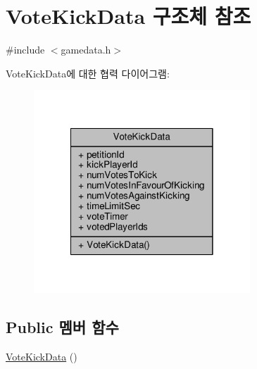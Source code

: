 \hypertarget{struct_vote_kick_data}{\section{Vote\-Kick\-Data 구조체 참조}
\label{struct_vote_kick_data}
}


{\ttfamily \#include $<$gamedata.\-h$>$}



Vote\-Kick\-Data에 대한 협력 다이어그램\-:\nopagebreak
\begin{figure}[H]
\begin{center}
\leavevmode
\includegraphics[width=230pt]{struct_vote_kick_data__coll__graph}
\end{center}
\end{figure}
\subsection*{Public 멤버 함수}
\begin{DoxyCompactItemize}
\item 
\hyperlink{struct_vote_kick_data_a4c0969c2c429557a27eaeff81f6ff58a}{Vote\-Kick\-Data} ()
\end{DoxyCompactItemize}
